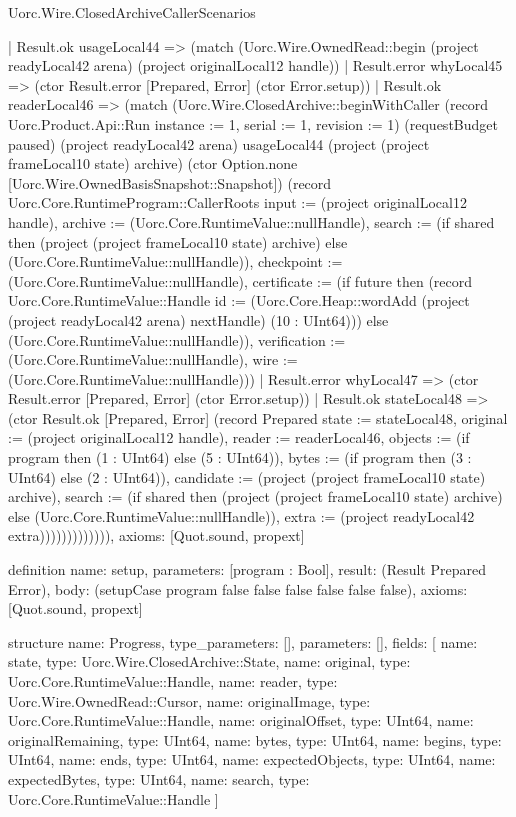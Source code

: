 \begin{lexlean}{Uorc.Wire.ClosedArchiveCallerScenarios}
\begin{semanticmodule}
{          | Result.ok usageLocal44 => (match (Uorc.Wire.OwnedRead::begin (project readyLocal42 arena) (project originalLocal12 handle))
            | Result.error whyLocal45 => (ctor Result.error [Prepared, Error] (ctor Error.setup))
            | Result.ok readerLocal46 => (match (Uorc.Wire.ClosedArchive::beginWithCaller (record Uorc.Product.Api::Run {instance := 1, serial := 1, revision := 1}) (requestBudget paused) (project readyLocal42 arena) usageLocal44 (project (project frameLocal10 state) archive) (ctor Option.none [Uorc.Wire.OwnedBasisSnapshot::Snapshot]) (record Uorc.Core.RuntimeProgram::CallerRoots {input := (project originalLocal12 handle), archive := (Uorc.Core.RuntimeValue::nullHandle), search := (if shared then (project (project frameLocal10 state) archive) else (Uorc.Core.RuntimeValue::nullHandle)), checkpoint := (Uorc.Core.RuntimeValue::nullHandle), certificate := (if future then (record Uorc.Core.RuntimeValue::Handle {id := (Uorc.Core.Heap::wordAdd (project (project readyLocal42 arena) nextHandle) (10 : UInt64))}) else (Uorc.Core.RuntimeValue::nullHandle)), verification := (Uorc.Core.RuntimeValue::nullHandle), wire := (Uorc.Core.RuntimeValue::nullHandle)}))
              | Result.error whyLocal47 => (ctor Result.error [Prepared, Error] (ctor Error.setup))
              | Result.ok stateLocal48 => (ctor Result.ok [Prepared, Error] (record Prepared {state := stateLocal48, original := (project originalLocal12 handle), reader := readerLocal46, objects := (if program then (1 : UInt64) else (5 : UInt64)), bytes := (if program then (3 : UInt64) else (2 : UInt64)), candidate := (project (project frameLocal10 state) archive), search := (if shared then (project (project frameLocal10 state) archive) else (Uorc.Core.RuntimeValue::nullHandle)), extra := (project readyLocal42 extra)})))))))))))),
  axioms: [Quot.sound, propext]
}

definition{
  name: setup,
  parameters: [program : Bool],
  result: (Result Prepared Error),
  body: (setupCase program false false false false false false),
  axioms: [Quot.sound, propext]
}

structure{
  name: Progress,
  type_parameters: [],
  parameters: [],
  fields: [
    {name: state, type: Uorc.Wire.ClosedArchive::State},
    {name: original, type: Uorc.Core.RuntimeValue::Handle},
    {name: reader, type: Uorc.Wire.OwnedRead::Cursor},
    {name: originalImage, type: Uorc.Core.RuntimeValue::Handle},
    {name: originalOffset, type: UInt64},
    {name: originalRemaining, type: UInt64},
    {name: bytes, type: UInt64},
    {name: begins, type: UInt64},
    {name: ends, type: UInt64},
    {name: expectedObjects, type: UInt64},
    {name: expectedBytes, type: UInt64},
    {name: search, type: Uorc.Core.RuntimeValue::Handle}
  ]
}


\end{semanticmodule}
\end{lexlean}
